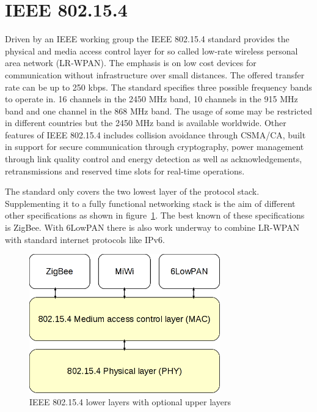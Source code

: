 \section{IEEE 802.15.4}
\label{intro802154}
Driven by an IEEE working group the IEEE 802.15.4 standard provides the physical and
media access control layer for so called low-rate wireless personal area network
(LR-WPAN). The emphasis is on low cost devices for communication without
infrastructure over small distances. The offered transfer rate can be up to 250 kbps.
The standard specifies three possible frequency bands to operate in. 16 channels
in the 2450 MHz band, 10 channels in the 915 MHz band and one channel in the 868
MHz band. The usage of some may be restricted in different countries but the 2450 MHz
band is available worldwide.
Other features of IEEE 802.15.4 includes collision avoidance through CSMA/CA, built
in support for secure communication through cryptography, power management through
link quality control and energy detection as well as acknowledgements,
retransmissions and reserved time slots for real-time operations.

The standard only covers the two lowest layer of the protocol stack. Supplementing
it to a fully functional networking stack is the aim of different other
specifications as shown in figure~\ref{fig:802154layer}. The best known of these
specifications is ZigBee. With 6LowPAN there is also work underway to combine
LR-WPAN with standard internet protocols like IPv6.

\begin{figure}
  \begin{center}
    \includegraphics[height=6cm]{images/802154layer}
    \caption{IEEE 802.15.4 lower layers with optional upper layers}
        \label{fig:802154layer}
  \end{center}
\end{figure}

